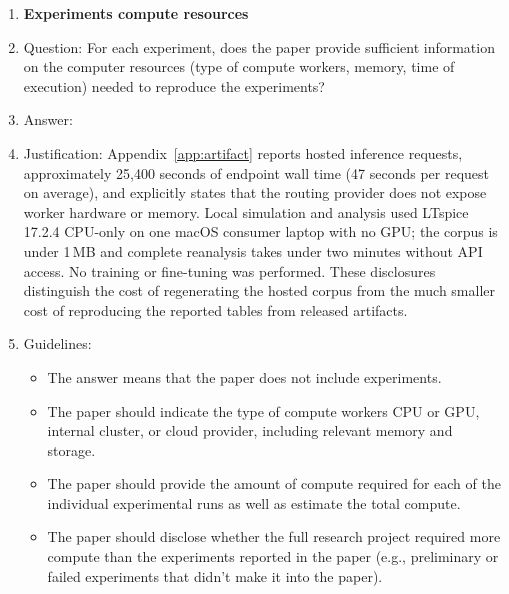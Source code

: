 \begin{enumerate}
\item {\bf Experiments compute resources}
    \item[] Question: For each experiment, does the paper provide sufficient information on the computer resources (type of compute workers, memory, time of execution) needed to reproduce the experiments?
    \item[] Answer: \answerYes{}
    \item[] Justification: Appendix~\ref{app:artifact} reports \CorpusTotal{} hosted inference requests, approximately 25{,}400 seconds of endpoint wall time (47 seconds per request on average), and explicitly states that the routing provider does not expose worker hardware or memory. Local simulation and analysis used LTspice 17.2.4 CPU-only on one macOS consumer laptop with no GPU; the corpus is under 1\,MB and complete reanalysis takes under two minutes without API access. No training or fine-tuning was performed. These disclosures distinguish the cost of regenerating the hosted corpus from the much smaller cost of reproducing the reported tables from released artifacts.
    \item[] Guidelines:
    \begin{itemize}
        \item The answer \answerNA{} means that the paper does not include experiments.
        \item The paper should indicate the type of compute workers CPU or GPU, internal cluster, or cloud provider, including relevant memory and storage.
        \item The paper should provide the amount of compute required for each of the individual experimental runs as well as estimate the total compute. 
        \item The paper should disclose whether the full research project required more compute than the experiments reported in the paper (e.g., preliminary or failed experiments that didn't make it into the paper). 
    \end{itemize}
    

\end{enumerate}
